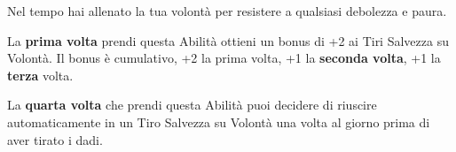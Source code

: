 \begin{multicols}{2}
Nel tempo hai allenato la tua volontà per resistere a qualsiasi debolezza e paura.

La \textbf{prima volta} prendi questa Abilità ottieni un bonus di +2 ai Tiri Salvezza su Volontà. Il bonus è cumulativo, +2 la prima volta, +1 la \textbf{seconda volta}, +1 la \textbf{terza} volta.

La \textbf{quarta volta} che prendi questa Abilità puoi decidere di riuscire automaticamente in un Tiro Salvezza su Volontà una volta al giorno prima di aver tirato i dadi.




\end{multicols}

\vfill

